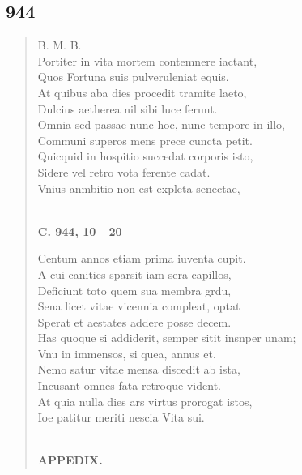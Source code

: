 \documentclass[11pt, a4paper]{report}
\begin{document}
            \subsection*{944}
      \begin{verse}
      B. M. B. \\ Portiter in vita mortem contemnere iactant, \\ Quos Fortuna suis pulveruleniat equis. \\ At quibus aba dies procedit tramite laeto, \\ Dulcius aetherea nil sibi luce ferunt. \\ Omnia sed passae nunc hoc, nunc tempore in illo, \\ Communi superos mens prece cuncta petit. \\ Quicquid in hospitio succedat corporis isto, \\ Sidere vel retro vota ferente cadat. \\ Vnius anmbitio non est expleta senectae, \\ 
        ﻿\pagebreak 
     \marginpar{[366]} \begin{center} \textbf{C. 944, 10—20} \end{center}Centum annos etiam prima iuventa cupit. \\ A cui canities sparsit iam sera capillos, \\ Deficiunt toto quem sua membra grdu, \\ Sena licet vitae vicennia compleat, optat \\ Sperat et aestates addere posse decem. \\ Has quoque si addiderit, semper sitit insnper unam; \\ Vnu in immensos, si quea, annus et. \\ Nemo satur vitae mensa discedit ab ista, \\ Incusant omnes fata retroque vident. \\ At quia nulla dies ars virtus prorogat istos, \\ Ioe patitur meriti nescia Vita sui. \\ 
        ﻿\pagebreak 
    \begin{center} \textbf{APPEDIX.} \end{center}
      \end{verse}
  
\end{document}
